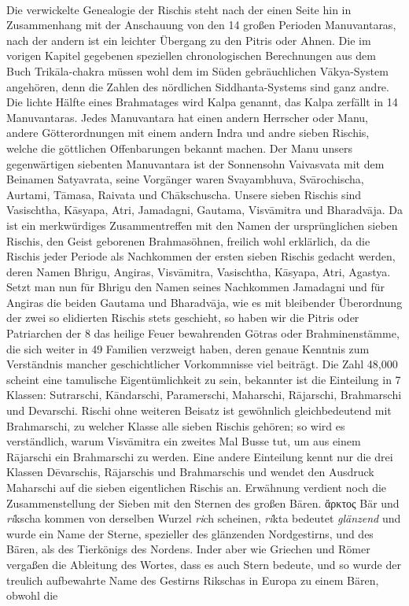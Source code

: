 \documentclass{article}
\begin{document}
\begin{center}
\end{center}
\paragraph{}
Die verwickelte Genealogie der Rischis steht nach der einen Seite hin in Zusammenhang mit der Anschauung von den 14 großen Perioden Manuvantaras, nach der andern ist ein leichter Übergang zu den Pitris oder Ahnen. Die im vorigen Kapitel gegebenen speziellen chronologischen Berechnungen aus dem Buch Trik\={a}la-chakra müssen wohl dem im Süden gebräuchlichen V\={a}kya-System angehören, denn die Zahlen des nördlichen Siddhanta-Systems sind ganz andre. Die lichte Hälfte eines Brahmatages wird Kalpa genannt, das Kalpa zerfällt in 14 Manuvantaras. Jedes Manuvantara hat einen andern Herrscher oder Manu, andere Götterordnungen mit einem andern Indra und andre sieben Rischis, welche die göttlichen Offenbarungen bekannt machen. Der Manu unsers gegenwärtigen siebenten Manuvantara ist der Sonnensohn Vaivasvata mit dem Beinamen Satyavrata, seine Vorgänger waren Svayambhuva, Sv\={a}rochischa, Aurtami, T\={a}masa, Raivata und Ch\={a}kschuscha. Unsere sieben Rischis sind Vasischtha, K\={a}syapa, Atri, Jamadagni, Gautama, Visv\={a}mitra und Bharadv\={a}ja. Da ist ein merkwürdiges Zusammentreffen mit den Namen der ursprünglichen sieben Rischis, den Geist geborenen Brahmasöhnen, freilich wohl erklärlich, da die Rischis jeder Periode als Nachkommen der ersten sieben Rischis gedacht werden, deren Namen Bhrigu, Angiras, Visv\={a}mitra, Vasischtha, K\={a}syapa, Atri, Agastya. Setzt man nun für Bhrigu den Namen seines Nachkommen Jamadagni und für Angiras die beiden Gautama und Bharadv\={a}ja, wie es mit bleibender Überordnung der zwei so elidierten Rischis stets geschieht, so haben wir die Pitris oder Patriarchen der 8 das heilige Feuer bewahrenden G\={o}tras oder Brahminenstämme, die sich weiter in 49 Familien verzweigt haben, deren genaue Kenntnis zum Verständnis mancher geschichtlicher Vorkommnisse viel beiträgt. Die Zahl 48,000 scheint eine tamulische Eigentümlichkeit zu sein, bekannter ist die Einteilung in 7 Klassen: Sutrarschi, K\={a}ndarschi, Paramerschi, Maharschi, R\={a}jarschi, Brahmarschi und Devarschi. Rischi ohne weiteren Beisatz ist gewöhnlich gleichbedeutend mit Brahmarschi, zu welcher Klasse alle sieben Rischis gehören; so wird es verständlich, warum Visv\={a}mitra ein zweites Mal Busse tut, um aus einem R\={a}jarschi ein Brahmarschi zu werden. Eine andere Einteilung kennt nur die drei Klassen D\={e}varschis, R\={a}jarschis und Brahmarschis und wendet den Ausdruck Maharschi auf die sieben eigentlichen Rischis an. Erwähnung verdient noch die Zusammenstellung der Sieben mit den Sternen des großen Bären. \textgreek{ἄρκτος} Bär und \emph{ri}kscha kommen von derselben Wurzel \emph{ri}ch scheinen, \emph{ri}kta bedeutet \emph{glänzend} und wurde ein Name der Sterne, spezieller des glänzenden Nordgestirns, und des Bären, als des Tierkönigs des Nordens. Inder aber wie Griechen und Römer vergaßen die Ableitung des Wortes, dass es auch Stern bedeute, und so wurde der treulich aufbewahrte Name des Gestirns Rikschas in Europa zu einem Bären, obwohl die 
\end{document}
